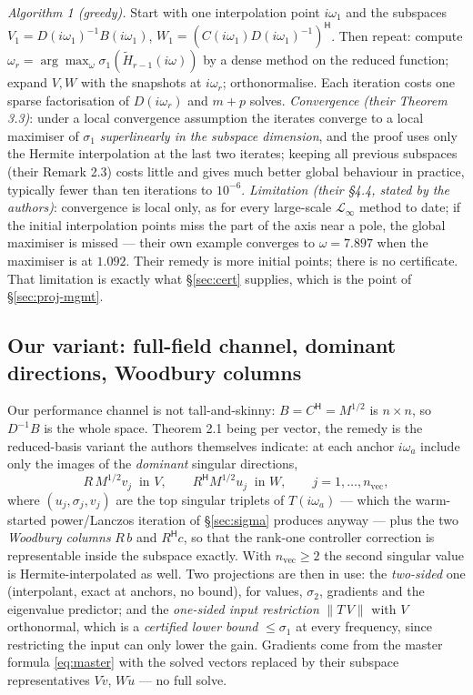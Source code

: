\documentclass[11pt,a4paper]{article}
\newcommand{\hp}{^{\mathsf H}}
\begin{document}
{{\emph{Algorithm 1 (greedy).}  Start with one interpolation point $i\omega_1$ and the
subspaces $V_1=D(i\omega_1)^{-1}B(i\omega_1)$, $W_1=(C(i\omega_1)D(i\omega_1)^{-1})\hp$.
Then repeat: compute $\omega_r=\arg\max_\omega\sigma_1(\tilde H_{r-1}(i\omega))$ by a
dense method on the reduced function; expand $V,W$ with the snapshots at $i\omega_r$;
orthonormalise.  Each iteration costs one sparse factorisation of $D(i\omega_r)$ and
$m+p$ solves.  \emph{Convergence (their Theorem 3.3)}: under a local convergence
assumption the iterates converge to a local maximiser of $\sigma_1$ \emph{superlinearly
in the subspace dimension}, and the proof uses only the Hermite interpolation at the last
two iterates; keeping all previous subspaces (their Remark 2.3) costs little and gives
much better global behaviour in practice, typically fewer than ten iterations to
$10^{-6}$.  \emph{Limitation (their \S4.4, stated by the authors)}: convergence is local
only, as for every large-scale $\mathcal L_\infty$ method to date; if the initial
interpolation points miss the part of the axis near a pole, the global maximiser is
missed --- their own example converges to $\omega=7.897$ when the maximiser is at
$1.092$.  Their remedy is more initial points; there is no certificate.  That limitation
is exactly what \S\ref{sec:cert} supplies, which is the point of \S\ref{sec:proj-mgmt}.

\subsection{Our variant: full-field channel, dominant directions, Woodbury columns}
\label{sec:proj-variant}
Our performance channel is not tall-and-skinny: $B=C\hp=M^{1/2}$ is $n\times n$, so
$D^{-1}B$ is the whole space.  Theorem 2.1 being per vector, the remedy is the
reduced-basis variant the authors themselves indicate: at each anchor $i\omega_a$ include
only the images of the \emph{dominant} singular directions,
\[
R\,M^{1/2}v_j\ \text{ in }V,\qquad R\hp M^{1/2}u_j\ \text{ in }W,\qquad j=1,\dots,n_{\mathrm{vec}},
\]
where $(u_j,\sigma_j,v_j)$ are the top singular triplets of $T(i\omega_a)$ --- which the
warm-started power/Lanczos iteration of \S\ref{sec:sigma} produces anyway --- plus the two
\emph{Woodbury columns} $R\,b$ and $R\hp c$, so that the rank-one controller correction
is representable inside the subspace exactly.  With $n_{\mathrm{vec}}\ge2$ the second
singular value is Hermite-interpolated as well.  Two projections are then in use:
the \emph{two-sided} one (interpolant, exact at anchors, no bound), for values,
$\sigma_2$, gradients and the eigenvalue predictor; and the \emph{one-sided input
restriction} $\|T\,V\|$ with $V$ orthonormal, which is a \emph{certified lower bound}
$\le\sigma_1$ at every frequency, since restricting the input can only lower the gain.
Gradients come from the master formula \eqref{eq:master} with the solved vectors replaced
by their subspace representatives $V\tilde v$, $W\tilde u$ --- no full solve.

}}
\end{document}
